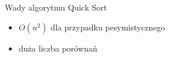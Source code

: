 \begin{frame}[squeeze]{Wady algorytmu Quick Sort}
	
	\begin{itemize}
		\item $O(n^2)$ dla przypadku pesymistycznego
		\item duża liczba porównań
	\end{itemize}
	
\end{frame}